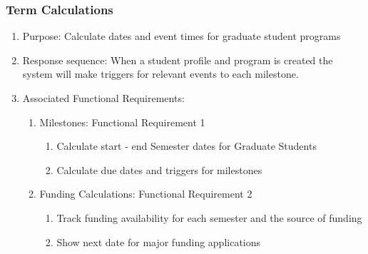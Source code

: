 \documentclass{journal}
\begin{document}
\subsubsection{Term Calculations}
\begin{enumerate}
\item Purpose: Calculate dates and event times for graduate student programs 
\item Response sequence: When a student profile and program is created the system will make triggers for relevant events to each milestone.
\item Associated Functional Requirements:
\begin{enumerate}
\item Milestones: Functional Requirement 1
\begin{enumerate}
\item Calculate start - end  Semester dates for Graduate Students
\item Calculate due dates and triggers for milestones
\end{enumerate}
\item Funding Calculations: Functional Requirement 2
\begin{enumerate}
\item Track funding availability for each semester and the source of funding
\item Show next date for major funding applications
\end{enumerate}
\end{enumerate}
\end{enumerate}
\end{document}
